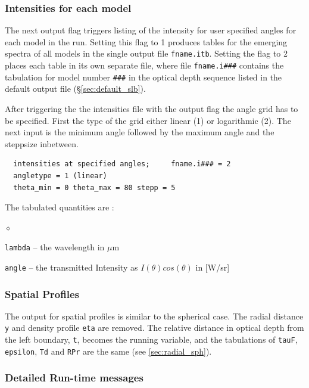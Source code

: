 \documentclass[11pt]{article}
\def\mic    {\hbox{$\mu$m}}
\begin{document}
\subsubsection{Intensities for each model }
\label{sec:inten_slb}

The next output flag triggers listing of the intensity for user
specified angles for each model in the run.  Setting this flag to 1
produces tables for the emerging spectra of all models in the single
output file {\tt fname.itb}.  Setting the flag to 2 places each table
in its own separate file, where file {\tt fname.i\#\#\#} contains the
tabulation for model number {\tt \#\#\#} in the optical depth sequence
listed in the default output file (\S\ref{sec:default_slb}).

After triggering the the intensities file with the output flag the
angle grid has to be specified. First the type of the grid either
linear (1) or logarithmic (2). The next input is the minimum angle
followed by the maximum angle and the steppsize inbetween.

\begin{verbatim}
  intensities at specified angles;     fname.i### = 2
  angletype = 1 (linear)
  theta_min = 0 theta_max = 80 stepp = 5
\end{verbatim}

The tabulated quantities are :
\begin{list}{$\diamond$}{}
\item {\tt lambda} -- the wavelength in \mic
\item {\tt angle} -- the transmitted Intensity as $I(\theta)
  cos(\theta)$ in [W/sr]
\end{list}


\subsubsection{Spatial Profiles}
\label{sec:spatial_slb}

The output for spatial profiles is similar to the spherical case. The
radial distance {\tt y} and density profile {\tt eta} are removed. The
relative distance in optical depth from the left boundary, {\tt t},
becomes the running variable, and the tabulations of {\tt tauF}, {\tt
  epsilon}, {\tt Td} and {\tt RPr} are the same (see
\ref{sec:radial_sph}).



\subsubsection{Detailed Run-time messages}
\label{sec:error_slb}
\end{document}
